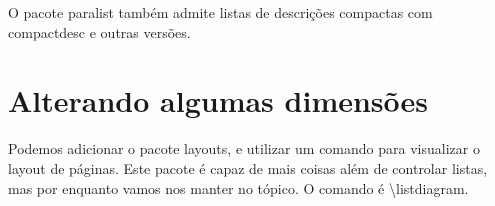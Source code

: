 O pacote paralist também admite listas de descrições compactas com compactdesc e outras versões.

\section{Alterando algumas dimensões}
Podemos adicionar o pacote layouts, e utilizar um comando para visualizar o
layout de páginas. Este pacote é capaz de mais coisas além de controlar listas,
mas por enquanto vamos nos manter no tópico. 
O comando é \textbackslash listdiagram.

\listdiagram


\setlist{}
\setitemize[1]{}
\setitemize[2]{}
\setenumerate[1]{}

\newpage
